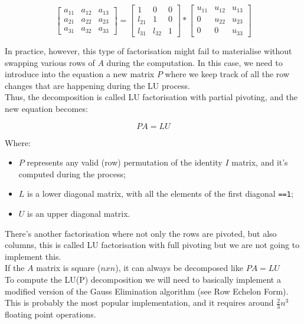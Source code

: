 $$
\begin{bmatrix}
a_{11} & a_{12} & a_{13} \\
a_{21} & a_{22} & a_{23} \\
a_{31} & a_{32} & a_{33} 
\end{bmatrix}
=
\begin{bmatrix}
1 & 0 & 0 \\
l_{21} & 1 & 0 \\
l_{31} & l_{32} & 1
\end{bmatrix} 
* 
\begin{bmatrix}
u_{11} & u_{12} & u_{13} \\
0 & u_{22} & u_{23} \\
0 & 0 & u_{33}
\end{bmatrix}
$$

In practice, however, this type of factorisation might fail to materialise without swapping various rows of $A$ during the computation. In this case, we need to introduce into the equation a new matrix $P$ where we keep track of all the row changes that are happening during the LU process.
\\

Thus, the decomposition is called LU factorisation with partial pivoting, and the new equation becomes:

$$
PA = LU
$$

Where:
\\

\begin{itemize}
\item $P$ represents any valid (row) permutation of the identity $I$ matrix, and it’s computed during the process;
\item $L$ is a lower diagonal matrix, with all the elements of the first diagonal {\tt ==1};
\item $U$ is an upper diagonal matrix.
\end{itemize}

There’s another factorisation where not only the rows are pivoted, but also columns, this is called LU factorisation with full pivoting but we are not going to implement this.
\\

If the $A$ matrix is square ($nxn$), it can always be decomposed like $PA=LU$
\\

To compute the LU(P) decomposition we will need to basically implement a modified version of the Gauss Elimination algorithm (see Row Echelon Form). This is probably the most popular implementation, and it requires around $\frac{2}{3} n^3$ floating point operations.
\\


